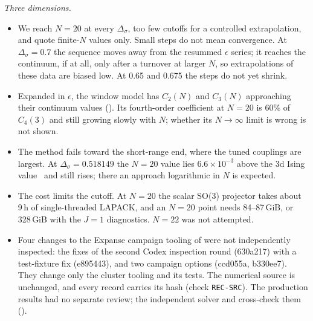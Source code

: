 \textit{Three dimensions.}
\begin{itemize}
\item We reach $N=20$ at every $\Delta_\sigma$, too few cutoffs for a controlled extrapolation, and quote finite-$N$
 values only. Small steps do not mean convergence. At $\Delta_\sigma=0.7$ the sequence moves away from the resummed
 $\epsilon$ series; it reaches the continuum, if at all, only after a turnover at larger $N$, so extrapolations of
 these data are biased low. At 0.65 and 0.675 the steps do not yet shrink.
\item Expanded in $\epsilon$, the window model has $C_2(N)$ and $C_3(N)$ approaching their continuum values
 (). Its fourth-order coefficient at $N=20$ is 60\% of $C_4(3)$ and still growing slowly with $N$;
 whether its $N\to\infty$ limit is wrong is not shown.
\item The method fails toward the short-range end, where the tuned couplings are largest. At $\Delta_\sigma=0.518149$
 the $N=20$ value lies $6.6\times10^{-3}$ above the 3d Ising value~\cite{ht:Chang:2024whx} and still rises; there an
 approach logarithmic in $N$ is expected.
\item The cost limits the cutoff. At $N=20$ the scalar SO(3) projector takes about 9\,h of single-threaded LAPACK,
 and an $N=20$ point needs 84--87\,GiB, or 328\,GiB with the $J=1$ diagnostics. $N=22$ was not attempted.
\item Four changes to the Expanse campaign tooling of  were not independently inspected:
 the fixes of the second Codex inspection round (630a217) with a test-fixture fix (e895443), and two campaign options
 (ccd055a, b330ee7). They change only the cluster tooling and its tests. The numerical source is unchanged, and every
 record carries its hash (check \texttt{REC-SRC}). The production results had no separate review; the independent
 solver and  cross-check them ().
\end{itemize}
